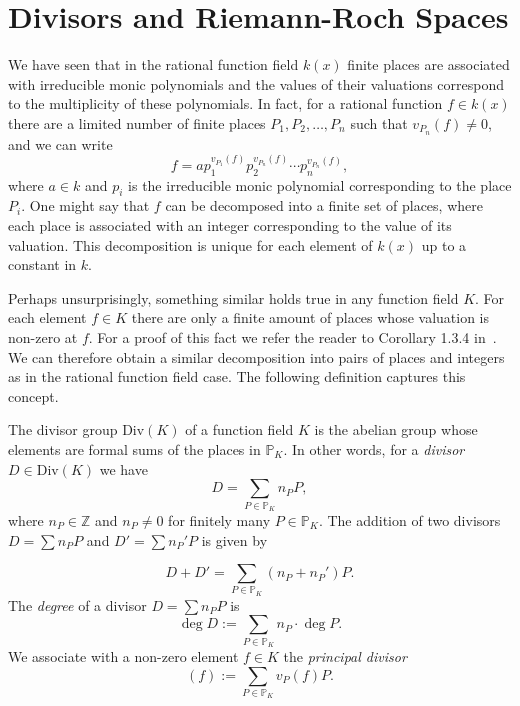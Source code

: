 \section{Divisors and Riemann-Roch Spaces}%
\label{sec:divisors-and-riemann-roch-spaces}

We have seen that in the rational function field \(k(x)\) finite places are associated with irreducible monic polynomials and the values of their valuations correspond to the multiplicity of these polynomials. In fact, for a rational function \(f \in k(x)\) there are a limited number of finite places \(P_{1}, P_{2}, \dots, P_{n}\) such that \(v_{P_{n}}(f) \neq 0\), and we can write
\[f = a p_{1}^{v_{P_{1}}(f)} p_{2}^{v_{P_{n}}(f)} \cdots p_{n}^{v_{P_{n}}(f)},\]
where \(a \in k\) and \(p_{i}\) is the irreducible monic polynomial corresponding to the place \(P_{i}\). One might say that \(f\) can be decomposed into a finite set of places, where each place is associated with an integer corresponding to the value of its valuation. This decomposition is unique for each element of \(k(x)\) up to a constant in \(k\).

Perhaps unsurprisingly, something similar holds true in any function field \(K\). For each element \(f \in K\) there are only a finite amount of places whose valuation is non-zero at \(f\). For a proof of this fact we refer the reader to Corollary 1.3.4 in~\cite{stichtenoth-2009-algebraic-function-fields}. We can therefore obtain a similar decomposition into pairs of places and integers as in the rational function field case. The following definition captures this concept.

\begin{definition}%
  \label{def:divisor}
  The divisor group \(\mathrm{Div}(K)\) of a function field \(K\) is the abelian group whose elements are formal sums of the places in \(\mathbb{P}_{K}\). In other words, for a \textit{divisor} \(D \in \mathrm{Div}(K)\) we have
  \[D = \sum_{P \in \mathbb{P}_{K}} n_{P} P,\]
  where \(n_{P} \in \mathbb{Z}\) and \(n_{P} \neq 0\) for finitely many \(P \in \mathbb{P}_{K}\). The addition of two divisors \({D = \sum n_{P}P}\) and \({D' = \sum n_{P}'P}\) is given by

  \[D + D' = \sum_{P \in \mathbb{P}_{K}} \left( n_{P} + n_{P}' \right) P.\]
  The \textit{degree} of a divisor \({D = \sum n_{P}P}\) is
  \[\deg{D} := \sum_{P \in \mathbb{P}_{K}} n_{P} \cdot \deg{P}.\]
  We associate with a non-zero element \(f \in K\) the \textit{principal divisor}
  \[(f) := \sum_{P \in \mathbb{P}_{K}} v_{P}(f) P.\]
\end{definition}

